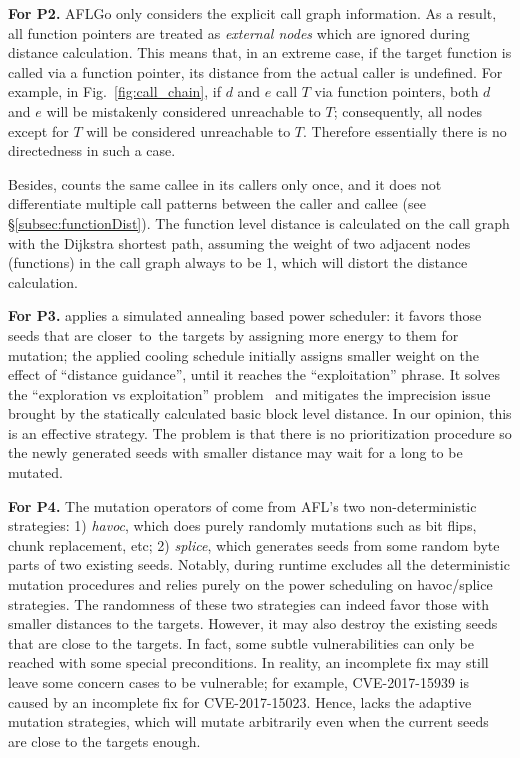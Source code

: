 \textbf{For P2.} AFLGo only considers the explicit call graph information.
As a result, all function pointers are treated as \emph{external nodes} which 
are ignored during distance calculation. 
This means that, in an extreme case, if the target function is called via a function pointer, its distance from the actual caller is undefined. 
For example, in Fig.~\ref{fig:call_chain}, if $d$ and $e$ call $T$ via function pointers, both $d$ and $e$ will be mistakenly considered unreachable to $T$; consequently, all nodes except for $T$ will be considered unreachable to $T$. Therefore essentially there is no directedness in such a case.


Besides, \aflgo counts the same callee in its callers only once, and it does not differentiate multiple call patterns between the caller and callee (see \S\ref{subsec:functionDist}).
The function level distance is calculated on the call graph with the Dijkstra shortest path, assuming the weight of two adjacent nodes (functions) in the call graph always to be 1, which will distort the distance calculation. 


\textbf{For P3. } 
\aflgo applies a simulated annealing based power scheduler: it favors those seeds that are closer~to~the targets by assigning more energy to them for mutation; the applied cooling schedule initially assigns smaller weight on the effect of ``distance guidance'', until it reaches the ``exploitation'' phrase. It solves the ``exploration vs exploitation'' problem~\cite{eve} and mitigates the imprecision issue brought by the statically calculated basic block level distance. In our opinion, this is an effective strategy. The problem is that there is no prioritization procedure so the newly generated seeds with smaller distance may wait for a long to be mutated.


 
\textbf{For P4. } The mutation operators of \aflgo come from AFL's two non-deterministic strategies: 1) \emph{havoc}, which does purely randomly mutations such as bit flips, chunk replacement, etc; 2) \emph{splice}, which generates seeds from some random byte parts of two existing seeds. 
Notably, during runtime \aflgo excludes all the deterministic mutation procedures and relies purely on the power scheduling on havoc/splice strategies.
The randomness of these two strategies can indeed favor those with smaller distances to the targets.
However, it may also destroy the existing seeds that are close to the targets.
In fact, some subtle vulnerabilities can only be reached with some special preconditions. In reality, an incomplete fix may still leave some concern cases to be vulnerable; for example, CVE-2017-15939 is caused by an incomplete fix for CVE-2017-15023.
Hence, \aflgo lacks the adaptive mutation strategies, which will mutate arbitrarily even when the current seeds are close to the targets enough.


